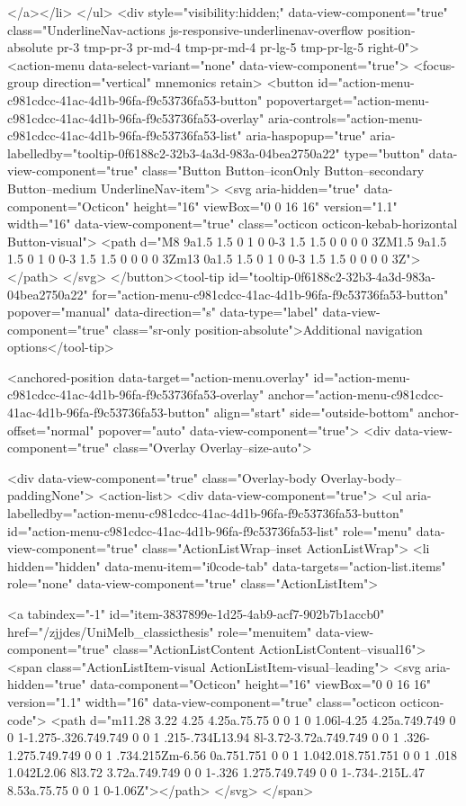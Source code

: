     
</a></li>
</ul>
    <div style="visibility:hidden;" data-view-component="true" class="UnderlineNav-actions js-responsive-underlinenav-overflow position-absolute pr-3 tmp-pr-3 pr-md-4 tmp-pr-md-4 pr-lg-5 tmp-pr-lg-5 right-0">      <action-menu data-select-variant="none" data-view-component="true">
  <focus-group direction="vertical" mnemonics retain>
    <button id="action-menu-c981cdcc-41ac-4d1b-96fa-f9c53736fa53-button" popovertarget="action-menu-c981cdcc-41ac-4d1b-96fa-f9c53736fa53-overlay" aria-controls="action-menu-c981cdcc-41ac-4d1b-96fa-f9c53736fa53-list" aria-haspopup="true" aria-labelledby="tooltip-0f6188c2-32b3-4a3d-983a-04bea2750a22" type="button" data-view-component="true" class="Button Button--iconOnly Button--secondary Button--medium UnderlineNav-item">  <svg aria-hidden="true" data-component="Octicon" height="16" viewBox="0 0 16 16" version="1.1" width="16" data-view-component="true" class="octicon octicon-kebab-horizontal Button-visual">
    <path d="M8 9a1.5 1.5 0 1 0 0-3 1.5 1.5 0 0 0 0 3ZM1.5 9a1.5 1.5 0 1 0 0-3 1.5 1.5 0 0 0 0 3Zm13 0a1.5 1.5 0 1 0 0-3 1.5 1.5 0 0 0 0 3Z"></path>
</svg>
</button><tool-tip id="tooltip-0f6188c2-32b3-4a3d-983a-04bea2750a22" for="action-menu-c981cdcc-41ac-4d1b-96fa-f9c53736fa53-button" popover="manual" data-direction="s" data-type="label" data-view-component="true" class="sr-only position-absolute">Additional navigation options</tool-tip>


<anchored-position data-target="action-menu.overlay" id="action-menu-c981cdcc-41ac-4d1b-96fa-f9c53736fa53-overlay" anchor="action-menu-c981cdcc-41ac-4d1b-96fa-f9c53736fa53-button" align="start" side="outside-bottom" anchor-offset="normal" popover="auto" data-view-component="true">
  <div data-view-component="true" class="Overlay Overlay--size-auto">
    
      <div data-view-component="true" class="Overlay-body Overlay-body--paddingNone">          <action-list>
  <div data-view-component="true">
    <ul aria-labelledby="action-menu-c981cdcc-41ac-4d1b-96fa-f9c53736fa53-button" id="action-menu-c981cdcc-41ac-4d1b-96fa-f9c53736fa53-list" role="menu" data-view-component="true" class="ActionListWrap--inset ActionListWrap">
        <li hidden="hidden" data-menu-item="i0code-tab" data-targets="action-list.items" role="none" data-view-component="true" class="ActionListItem">
    
    
    <a tabindex="-1" id="item-3837899e-1d25-4ab9-acf7-902b7b1accb0" href="/zjjdes/UniMelb_classicthesis" role="menuitem" data-view-component="true" class="ActionListContent ActionListContent--visual16">
        <span class="ActionListItem-visual ActionListItem-visual--leading">
          <svg aria-hidden="true" data-component="Octicon" height="16" viewBox="0 0 16 16" version="1.1" width="16" data-view-component="true" class="octicon octicon-code">
    <path d="m11.28 3.22 4.25 4.25a.75.75 0 0 1 0 1.06l-4.25 4.25a.749.749 0 0 1-1.275-.326.749.749 0 0 1 .215-.734L13.94 8l-3.72-3.72a.749.749 0 0 1 .326-1.275.749.749 0 0 1 .734.215Zm-6.56 0a.751.751 0 0 1 1.042.018.751.751 0 0 1 .018 1.042L2.06 8l3.72 3.72a.749.749 0 0 1-.326 1.275.749.749 0 0 1-.734-.215L.47 8.53a.75.75 0 0 1 0-1.06Z"></path>
</svg>
        </span>
      

